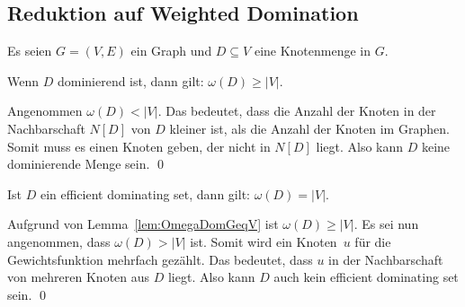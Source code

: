 \subsection{Reduktion auf Weighted Domination}
Es seien $G=(V,E)$ ein Graph und $D \subseteq V$ eine Knotenmenge in $G$.

\begin{Lemma}\label{lem:OmegaDomGeqV}
    Wenn $D$ dominierend ist, dann gilt: $\omega(D) \geq |V|$.
\end{Lemma}

\begin{Proof}
    Angenommen $\omega(D) < |V|$. Das bedeutet, dass die Anzahl der Knoten in der Nachbarschaft $N[D]$ von $D$ kleiner ist, als die Anzahl der Knoten im Graphen. Somit muss es einen Knoten geben, der nicht in $N[D]$ liegt. Also kann $D$ keine dominierende Menge sein.
    \qed
\end{Proof}

\begin{Lemma}\label{lem:OmegaDomEqualV}
    Ist $D$ ein efficient dominating set, dann gilt: $\omega(D) = |V|$.
\end{Lemma}

\begin{Proof}
    Aufgrund von Lemma~\ref{lem:OmegaDomGeqV} ist $\omega(D) \geq |V|$. Es sei nun angenommen, dass $\omega(D) > |V|$ ist. Somit wird ein Knoten~$u$ für die Gewichtsfunktion mehrfach gezählt. Das bedeutet, dass $u$ in der Nachbarschaft von mehreren Knoten aus $D$ liegt. Also kann $D$ auch kein efficient dominating set sein.
    \qed
\end{Proof}

%

%
%


